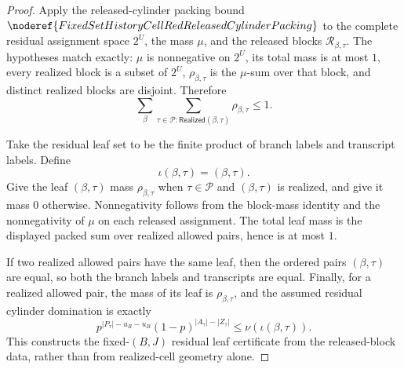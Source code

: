 \begin{proof}
Apply the released-cylinder packing bound
\(\noderef{FixedSetHistoryCellRedReleasedCylinderPacking}\) to the complete
residual assignment space \(2^U\), the mass \(\mu\), and the released
blocks \(\mathcal R_{\beta,\tau}\).  The hypotheses match exactly: \(\mu\)
is nonnegative on \(2^U\), its total mass is at most \(1\), every realized
block is a subset of \(2^U\), \(\rho_{\beta,\tau}\) is the \(\mu\)-sum over
that block, and distinct realized blocks are disjoint.  Therefore
\[
\sum_\beta
  \sum_{\tau\in\mathcal P:\mathsf{Realized}(\beta,\tau)}
    \rho_{\beta,\tau}
\le 1 .
\]

Take the residual leaf set to be the finite product of branch labels and
transcript labels.  Define
\[
\iota(\beta,\tau)=(\beta,\tau).
\]
Give the leaf \((\beta,\tau)\) mass \(\rho_{\beta,\tau}\) when
\(\tau\in\mathcal P\) and \((\beta,\tau)\) is realized, and give it mass
\(0\) otherwise.  Nonnegativity follows from the block-mass identity and the
nonnegativity of \(\mu\) on each released assignment.  The total leaf mass is
the displayed packed sum over realized allowed pairs, hence is at most
\(1\).

If two realized allowed pairs have the same leaf, then the ordered pairs
\((\beta,\tau)\) are equal, so both the branch labels and transcripts are
equal.  Finally, for a realized allowed pair, the mass of its leaf is
\(\rho_{\beta,\tau}\), and the assumed residual cylinder domination is
exactly
\[
p^{|P_\tau|-u_R-u_B}(1-p)^{|A_\tau|-|Z_\tau|}
  \le \nu(\iota(\beta,\tau)).
\]
This constructs the fixed-\((B,J)\) residual leaf certificate from the
released-block data, rather than from realized-cell geometry alone.
\end{proof}
